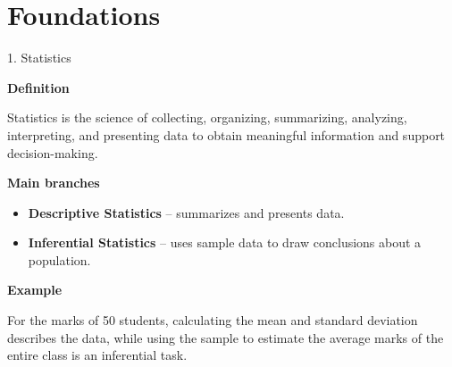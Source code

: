 
\section{Foundations}


\begin{frame}{1. Statistics}

\textbf{Definition}

Statistics is the science of collecting, organizing, summarizing,
analyzing, interpreting, and presenting data to obtain meaningful
information and support decision-making.

\vspace{0.4cm}

\textbf{Main branches}

\begin{itemize}
    \item \textbf{Descriptive Statistics} -- summarizes and presents data.
    \item \textbf{Inferential Statistics} -- uses sample data to draw
    conclusions about a population.
\end{itemize}

\vspace{0.3cm}

\textbf{Example}

For the marks of 50 students, calculating the mean and standard
deviation describes the data, while using the sample to estimate
the average marks of the entire class is an inferential task.

\end{frame}



